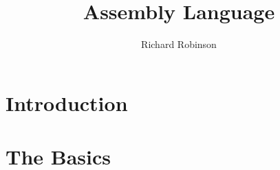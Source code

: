 \documentclass{tufte-book}
\title{Assembly Language}
\author{Richard Robinson}
\begin{document}
\frontmatter
\maketitle
\tableofcontents
\mainmatter

\setlength{\parindent}{0pt}


\chapter{Introduction}

\chapter{The Basics}
\end{document}
